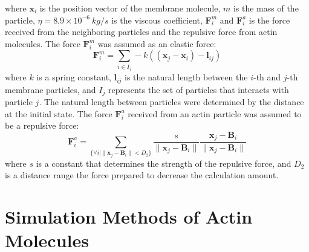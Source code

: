 \documentclass[a4paper,12pt, oneside]{book}
\begin{document}
where  $\bm{x}_i$ is the position vector of the membrane molecule, $m$ is the mass of the particle, $\eta=8.9\times10^{-6}\si{~kg/s}$ is the viscous coefficient, $\bm{F}^m_i$ and $\bm{F}^a_i$ is the force received from the neighboring particles and  the repulsive force from actin molecules.
The force  $\bm{F}^m_i$ was assumed as an elastic force:
\begin{equation}
\bm{F}^m_i = \sum_{i \in I_j}  -k((\bm{x}_j -\bm{x}_i )-\bm{l}_{ij} )
\end{equation}
where $k$ is a spring constant, $\bm{l}_{ij}$ is the natural length between the $i$-th and $j$-th membrane particles, and $I_j$ represents the set of particles that interacts with particle $j$.
The natural length between particles were determined by the distance  at the initial state.
The force $\bm{F}^a_i$ received from an actin particle was assumed to be a  repulsive force:
\begin{equation}
\bm{F}^a_i = \sum_{\{ \forall i | \| \bm{x}_j - \bm{B}_i \|<D_2\}} \frac{s}{\|\bm{x}_j -\bm{B}_i \|} \frac{\bm{x}_j -\bm{B}_i }{\|\bm{x}_j -\bm{B}_i \|}
\end{equation}
where $s$ is a constant that determines the strength of the repulsive force, and $D_2$ is a distance range  the  force prepared to decrease the calculation amount.

\section{Simulation Methods of Actin Molecules}
\end{document}
